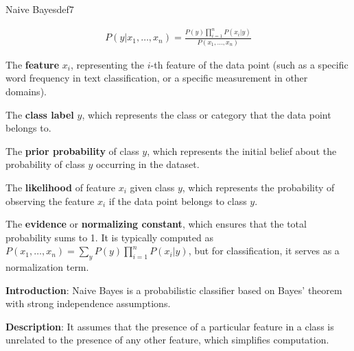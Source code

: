 \documentclass[
  12 pt,
  a4paper,
]{book}
\numberwithin{equation}{section}
\theoremstyle{plain}      %
\theoremstyle{definition} %
\theoremstyle{remark}     %
\theoremstyle{note}         %
\begin{document}
\vspace*{\fill}
\begin{a_def_eq}{Naive Bayes}{def7} 

\begin{align}\label{naivebayes}
P(y | x_1, \ldots, x_n) = \frac{P(y) \prod_{i=1}^{n} P(x_i | y)}{P(x_1, \ldots, x_n)}
\end{align}

\begin{description}[align=left, labelwidth=2.5cm, labelsep=0em, leftmargin=2.5cm] 
    \item[$x_i$] The \textbf{feature} \( x_i \), representing the \(i\)-th feature of the data point (such as a specific word frequency in text classification, or a specific measurement in other domains).
    \vspace{0.5\baselineskip}
    \item[$y$] The \textbf{class label} \( y \), which represents the class or category that the data point belongs to.
    \vspace{0.5\baselineskip}
    \item[$P(y)$] The \textbf{prior probability} of class \( y \), which represents the initial belief about the probability of class \( y \) occurring in the dataset.
    \vspace{0.5\baselineskip}
    \item[$P(x_i | y)$] The \textbf{likelihood} of feature \( x_i \) given class \( y \), which represents the probability of observing the feature \( x_i \) if the data point belongs to class \( y \).
    \vspace{0.5\baselineskip}
    \item[$P(x_1, \ldots, x_n)$] The \textbf{evidence} or \textbf{normalizing constant}, which ensures that the total probability sums to 1. It is typically computed as \( P(x_1, \ldots, x_n) = \sum_y P(y) \prod_{i=1}^{n} P(x_i | y) \), but for classification, it serves as a normalization term.
\end{description}

\end{a_def_eq}

\hfill\break

\textbf{Introduction}: Naive Bayes is a probabilistic classifier based
on Bayes' theorem with strong independence assumptions.

\textbf{Description}: It assumes that the presence of a particular
feature in a class is unrelated to the presence of any other feature,
which simplifies computation.
\end{document}
